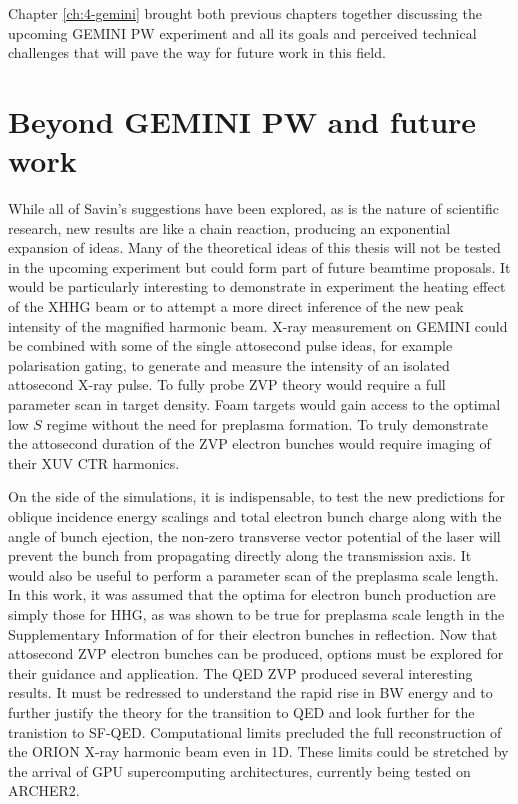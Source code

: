 Chapter \ref{ch:4-gemini} brought both previous chapters together discussing the upcoming GEMINI PW experiment and all its goals and perceived technical challenges that will pave the way for future work in this field.

\section{Beyond GEMINI PW and future work}\label{sec:ch4-beyond}
While all of Savin's suggestions have been explored, as is the nature of scientific research, new results are like a chain reaction, producing an exponential expansion of ideas. Many of the theoretical ideas of this thesis will not be tested in the upcoming experiment but could form part of future beamtime proposals. It would be particularly interesting to demonstrate in experiment the heating effect of the XHHG beam or to attempt a more direct inference of the new peak intensity of the magnified harmonic beam. X-ray measurement on GEMINI could be combined with some of the single attosecond pulse ideas, for example polarisation gating, to generate and measure the intensity of an isolated attosecond X-ray pulse. To fully probe ZVP theory would require a full parameter scan in target density. Foam targets would gain access to the optimal low $S$ regime \cite{bataniPhysicsIssuesShock2014} without the need for preplasma formation. To truly demonstrate the attosecond duration of the ZVP electron bunches would require imaging of their XUV CTR harmonics.

On the side of the simulations, it is indispensable, to test the new predictions for oblique incidence energy scalings and total electron bunch charge along with the angle of bunch ejection, the non-zero transverse vector potential of the laser will prevent the bunch from propagating directly along the transmission axis. It would also be useful to perform a parameter scan of the preplasma scale length. In this work, it was assumed that the optima for electron bunch production are simply those for \ac{HHG}, as was shown to be true for preplasma scale length in the Supplementary Information of \cite{thevenetVacuumLaserAcceleration2016} for their electron bunches in reflection. Now that attosecond ZVP electron bunches can be produced, options must be explored for their guidance and application. The QED ZVP produced several interesting results. It must be redressed to understand the rapid rise in BW energy and to further justify the theory for the transition to QED and look further for the tranistion to SF-QED. Computational limits precluded the full reconstruction of the ORION X-ray harmonic beam even in 1D. These limits could be stretched by the arrival of GPU supercomputing architectures, currently being tested on ARCHER2. 

